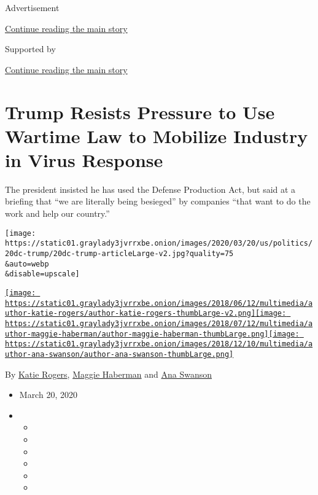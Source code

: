 Advertisement

\protect\hyperlink{after-top}{Continue reading the main story}

Supported by

\protect\hyperlink{after-sponsor}{Continue reading the main story}

\hypertarget{trump-resists-pressure-to-use-wartime-law-to-mobilize-industry-in-virus-response}{%
\section{Trump Resists Pressure to Use Wartime Law to Mobilize Industry
in Virus
Response}\label{trump-resists-pressure-to-use-wartime-law-to-mobilize-industry-in-virus-response}}

The president insisted he has used the Defense Production Act, but said
at a briefing that ``we are literally being besieged'' by companies
``that want to do the work and help our country.''

\texttt{[image: https://static01.graylady3jvrrxbe.onion/images/2020/03/20/us/politics/20dc-trump/20dc-trump-articleLarge-v2.jpg?quality=75\\\&auto=webp\\\&disable=upscale]}

\href{https://www.nytimes3xbfgragh.onion/by/katie-rogers}{\texttt{[image: https://static01.graylady3jvrrxbe.onion/images/2018/06/12/multimedia/author-katie-rogers/author-katie-rogers-thumbLarge-v2.png]}}\href{https://www.nytimes3xbfgragh.onion/by/maggie-haberman}{\texttt{[image: https://static01.graylady3jvrrxbe.onion/images/2018/07/12/multimedia/author-maggie-haberman/author-maggie-haberman-thumbLarge.png]}}\href{https://www.nytimes3xbfgragh.onion/by/ana-swanson}{\texttt{[image: https://static01.graylady3jvrrxbe.onion/images/2018/12/10/multimedia/author-ana-swanson/author-ana-swanson-thumbLarge.png]}}

By \href{https://www.nytimes3xbfgragh.onion/by/katie-rogers}{Katie
Rogers},
\href{https://www.nytimes3xbfgragh.onion/by/maggie-haberman}{Maggie
Haberman} and
\href{https://www.nytimes3xbfgragh.onion/by/ana-swanson}{Ana Swanson}

\begin{itemize}
\item
  March 20, 2020
\item
  \begin{itemize}
  \item
  \item
  \item
  \item
  \item
  \item
  \end{itemize}
\end{itemize}

